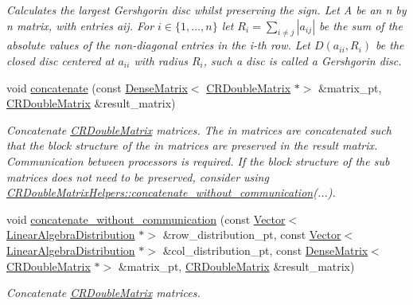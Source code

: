 \begin{DoxyCompactItemize}
\begin{DoxyCompactList}\small\item\em Calculates the largest Gershgorin disc whilst preserving the sign. Let A be an n by n matrix, with entries aij. For $ i \in \{ 1,...,n \} $ let $ R_i = \sum_{i\neq j} |a_{ij}| $ be the sum of the absolute values of the non-\/diagonal entries in the i-\/th row. Let $ D(a_{ii},R_i) $ be the closed disc centered at $ a_{ii} $ with radius $ R_i $, such a disc is called a Gershgorin disc. \end{DoxyCompactList}\item 
void \hyperlink{namespaceoomph_1_1CRDoubleMatrixHelpers_aba5724bb1f89625f601045ba6ad139bf}{concatenate} (const \hyperlink{classoomph_1_1DenseMatrix}{Dense\+Matrix}$<$ \hyperlink{classoomph_1_1CRDoubleMatrix}{C\+R\+Double\+Matrix} $\ast$$>$ \&matrix\+\_\+pt, \hyperlink{classoomph_1_1CRDoubleMatrix}{C\+R\+Double\+Matrix} \&result\+\_\+matrix)
\begin{DoxyCompactList}\small\item\em Concatenate \hyperlink{classoomph_1_1CRDoubleMatrix}{C\+R\+Double\+Matrix} matrices. The in matrices are concatenated such that the block structure of the in matrices are preserved in the result matrix. Communication between processors is required. If the block structure of the sub matrices does not need to be preserved, consider using \hyperlink{namespaceoomph_1_1CRDoubleMatrixHelpers_ab335593fd53dbb5162fd63f14db95377}{C\+R\+Double\+Matrix\+Helpers\+::concatenate\+\_\+without\+\_\+communication}(...). \end{DoxyCompactList}\item 
void \hyperlink{namespaceoomph_1_1CRDoubleMatrixHelpers_ab335593fd53dbb5162fd63f14db95377}{concatenate\+\_\+without\+\_\+communication} (const \hyperlink{classoomph_1_1Vector}{Vector}$<$ \hyperlink{classoomph_1_1LinearAlgebraDistribution}{Linear\+Algebra\+Distribution} $\ast$$>$ \&row\+\_\+distribution\+\_\+pt, const \hyperlink{classoomph_1_1Vector}{Vector}$<$ \hyperlink{classoomph_1_1LinearAlgebraDistribution}{Linear\+Algebra\+Distribution} $\ast$$>$ \&col\+\_\+distribution\+\_\+pt, const \hyperlink{classoomph_1_1DenseMatrix}{Dense\+Matrix}$<$ \hyperlink{classoomph_1_1CRDoubleMatrix}{C\+R\+Double\+Matrix} $\ast$$>$ \&matrix\+\_\+pt, \hyperlink{classoomph_1_1CRDoubleMatrix}{C\+R\+Double\+Matrix} \&result\+\_\+matrix)
\begin{DoxyCompactList}\small\item\em Concatenate \hyperlink{classoomph_1_1CRDoubleMatrix}{C\+R\+Double\+Matrix} matrices. \end{DoxyCompactList}\item 

\end{DoxyCompactItemize}
